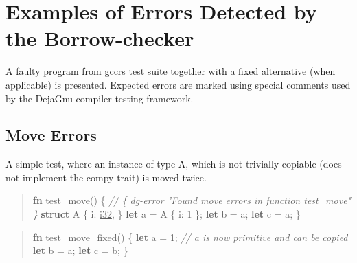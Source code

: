 \documentclass[
  11pt,
  twoside,symmetric]{report}
\newenvironment{Shaded}{}{}
\newcommand{\CommentTok}[1]{\textit{#1}}
\newcommand{\DataTypeTok}[1]{\underline{#1}}
\newcommand{\DecValTok}[1]{#1}
\newcommand{\KeywordTok}[1]{\textbf{#1}}
\newcommand{\NormalTok}[1]{#1}
\newcommand{\OperatorTok}[1]{#1}
\begin{document}
\hypertarget{examples-of-errors-detected-by-the-borrow-checker}{%
\chapter{Examples of Errors Detected by the
Borrow-checker}\label{examples-of-errors-detected-by-the-borrow-checker}}

A faulty program from gccrs test suite together with a fixed alternative
(when applicable) is presented. Expected errors are marked using special
comments used by the DejaGnu compiler testing framework.

\hypertarget{move-errors}{%
\section{Move Errors}\label{move-errors}}

A simple test, where an instance of type A, which is not trivially
copiable (does not implement the compy trait) is moved twice.

\begin{quote}
\begin{Shaded}
\begin{Highlighting}[]
\KeywordTok{fn}\NormalTok{ test\_move() }\OperatorTok{\{}
    \CommentTok{// \{ dg{-}error "Found move errors in function test\_move" \}}
    \KeywordTok{struct}\NormalTok{ A }\OperatorTok{\{}
\NormalTok{        i}\OperatorTok{:} \DataTypeTok{i32}\OperatorTok{,}
    \OperatorTok{\}}
    \KeywordTok{let}\NormalTok{ a }\OperatorTok{=}\NormalTok{ A }\OperatorTok{\{}\NormalTok{ i}\OperatorTok{:} \DecValTok{1} \OperatorTok{\};}
    \KeywordTok{let}\NormalTok{ b }\OperatorTok{=}\NormalTok{ a}\OperatorTok{;}
    \KeywordTok{let}\NormalTok{ c }\OperatorTok{=}\NormalTok{ a}\OperatorTok{;}
\OperatorTok{\}}
\end{Highlighting}
\end{Shaded}
\end{quote}

\begin{quote}
\begin{Shaded}
\begin{Highlighting}[]
\KeywordTok{fn}\NormalTok{ test\_move\_fixed() }\OperatorTok{\{}
    \KeywordTok{let}\NormalTok{ a }\OperatorTok{=} \DecValTok{1}\OperatorTok{;} \CommentTok{// a is now primitive and can be copied}
    \KeywordTok{let}\NormalTok{ b }\OperatorTok{=}\NormalTok{ a}\OperatorTok{;}
    \KeywordTok{let}\NormalTok{ c }\OperatorTok{=}\NormalTok{ b}\OperatorTok{;}
\OperatorTok{\}}
\end{Highlighting}
\end{Shaded}
\end{quote}
\end{document}
